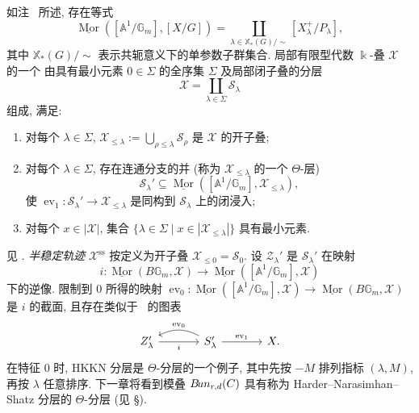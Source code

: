 \begin{remark}\label{src:8.7.8}
如注~ 所述, 存在等式
\[
\underline{\operatorname{Mor}}([\mathbb A^1/\mathbb G_m],[X/G])=\coprod_{\lambda\in\mathbb X_*(G)/\sim}[X_\lambda^+/P_\lambda],
\]
其中 $\mathbb X_*(G)/\sim$ 表示共轭意义下的单参数子群集合. 局部有限型代数 $\Bbbk$-叠 $\mathcal X$ 的一个 由具有最小元素 $0\in\Sigma$ 的全序集 $\Sigma$ 及局部闭子叠的分层
\[
\mathcal X=\coprod_{\lambda\in\Sigma}\mathcal S_\lambda
\]
组成, 满足:
\begin{enumerate}[(1)]
\item 对每个 $\lambda\in\Sigma$, $\mathcal X_{\leq\lambda}:=\bigcup_{\rho\leq\lambda}\mathcal S_\rho$ 是 $\mathcal X$ 的开子叠;
\item 对每个 $\lambda\in\Sigma$, 存在连通分支的并 (称为 $\mathcal X_{\leq\lambda}$ 的一个 $\Theta$-层)
\[
\mathcal S_\lambda'\subseteq\underline{\operatorname{Mor}}([\mathbb A^1/\mathbb G_m],\mathcal X_{\leq\lambda}),
\]
使 $\operatorname{ev}_1:\mathcal S_\lambda'\to\mathcal X_{\leq\lambda}$ 是同构到 $\mathcal S_\lambda$ 上的闭浸入;
\item 对每个 $x\in|\mathcal X|$, 集合 $\{\lambda\in\Sigma\mid x\in|\mathcal X_{\leq\lambda}|\}$ 具有最小元素.
\end{enumerate}
见 \cite{HL14}. \textit{半稳定轨迹} $\mathcal X^{\mathrm{ss}}$ 按定义为开子叠 $\mathcal X_{\leq0}=\mathcal S_0$. 设 $\mathcal Z_\lambda'$ 是 $\mathcal S_\lambda'$ 在映射
\[
i:\underline{\operatorname{Mor}}(B\mathbb G_m,\mathcal X)\longrightarrow\underline{\operatorname{Mor}}([\mathbb A^1/\mathbb G_m],\mathcal X)
\]
下的逆像. 限制到 $0$ 所得的映射 $\operatorname{ev}_0:\underline{\operatorname{Mor}}([\mathbb A^1/\mathbb G_m],\mathcal X)\to\underline{\operatorname{Mor}}(B\mathbb G_m,\mathcal X)$ 是 $i$ 的截面, 且存在类似于~ 的图表
\[
\begin{tikzcd}[ampersand replacement=\&,column sep=large]
\mathcal Z_\lambda'\arrow[r,"i"']\&\mathcal S_\lambda'\arrow[l,bend right=28,"\operatorname{ev}_0"']\arrow[r,"\operatorname{ev}_1"]\&\mathcal X.
\end{tikzcd}
\]
在特征 $0$ 时, HKKN 分层是 $\Theta$-分层的一个例子, 其中先按 $-M$ 排列指标 $(\lambda,M)$, 再按 $\lambda$ 任意排序. 下一章将看到模叠 $B\!un_{r,d}(C)$ 具有称为 Harder--Narasimhan--Shatz 分层的 $\Theta$-分层 (见 \S{}).
\end{remark}


